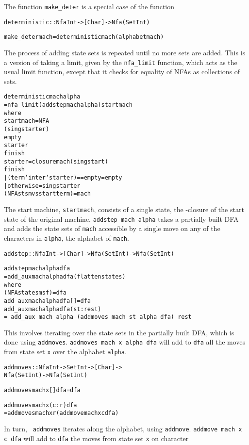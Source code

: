 \documentclass[11pt]{article}
\begin{document}
The function {\tt make\_deter} is a special case of the function
\begin{alltt}
deterministic :: Nfa Int -> [Char] -> Nfa (Set Int)
 
make\_deter mach = deterministic mach (alphabet mach)
\end{alltt}
The process of adding state sets is repeated until no more sets are added.
This is a version of taking a limit, given by the {\tt nfa\_limit} function,
which acts as the usual limit function, except that it checks for equality 
of NFAs as collections of sets.
\begin{alltt}
deterministic mach alpha 
  = nfa_limit (addstep mach alpha) startmach
    where
    startmach = NFA 
                (sing starter)
                empty
                starter
                finish
    starter = closure mach (sing start)
    finish  
      | (term `inter` starter) == empty     = empty		
      | otherwise                           = sing starter	
    (NFA sts mvs start term) = mach
\end{alltt}
The start machine, {\tt startmach}, consists of a single state, the
\eps-closure of the start state of the original machine. {\tt addstep mach
alpha} takes a partially built DFA and adds the state sets of {\tt mach}
accessible by a single move on any of the characters in {\tt alpha}, the
alphabet of {\tt mach}.
\begin{alltt}
addstep :: Nfa Int -> [Char] -> Nfa (Set Int) -> Nfa (Set Int)

addstep mach alpha dfa
  = add\_aux mach alpha dfa (flatten states)
    where
    (NFA states m s f) = dfa
    add\_aux mach alpha dfa [] = dfa
    add\_aux mach alpha dfa (st:rest)
        \mbox{= add\_aux mach alpha (addmoves mach st alpha dfa) rest}
\end{alltt}
This involves iterating over the state sets in the 
partially built DFA, which is done using {\tt addmoves}. {\tt addmoves mach x
alpha dfa} will add to {\tt dfa} all the moves from state set {\tt x} over the
alphabet {\tt alpha}.
\begin{alltt}
addmoves :: Nfa Int -> Set Int -> [Char] -> 
            Nfa (Set Int) -> Nfa (Set Int)

addmoves mach x [] dfa    = dfa
 
addmoves mach x (c:r) dfa
  = addmoves mach x r (addmove mach x c dfa)
\end{alltt}
In turn, {\tt
addmoves} iterates along the alphabet, using {\tt addmove}. {\tt addmove mach
x c dfa} will add to {\tt dfa} the moves from state set {\tt x} on character
\end{document}

